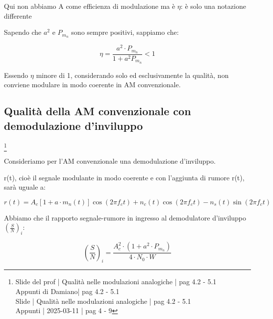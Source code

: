 \begin{tcolorbox}
    Qui non abbiamo A come efficienza di modulazione ma è $\eta$: è solo una notazione differente
\end{tcolorbox}

Sapendo che $a^{2}$ e $P_{m_n}$ sono sempre positivi, sappiamo che: 

{
    \Large 
    \begin{equation}
        \eta = \frac{a^{2} \cdot P_{m_n}}{1 + a^{2} P_{m_n}} < 1
    \end{equation}
}

Essendo $\eta$ minore di 1, considerando solo ed esclusivamente la qualità, non conviene modulare in modo coerente in AM convenzionale. \newline 

\newpage 

\subsection{Qualità della AM convenzionale con demodulazione d'inviluppo }
\footnote{Slide del prof | Qualità nelle modulazioni analogiche | pag 4.2 - 5.1\\  
Appunti di Damiano| pag 4.2 - 5.1\\
Slide | Qualità nelle modulazioni analogiche | pag 4.2 - 5.1 \\
Appunti | 2025-03-11 | pag 4 - 9  
} 

Consideriamo per l'AM convenzionale una demodulazione d'inviluppo. \newline 

r(t), cioè il segnale modulante in modo coerente e con l'aggiunta di rumore r(t), sarà uguale a: 

{
    \Large 
    \begin{equation}
        r(t)
        =
        A_c \left[ 1 + a \cdot m_n (t)\right] 
        \cos(2 \pi f_c t)
        +
        n_c (t) \cos(2 \pi f_c t) 
        - 
        n_s (t) \sin(2 \pi f_c t) 
    \end{equation}
}


Abbiamo che il rapporto segnale-rumore in ingresso al demodulatore d'inviluppo $\left( \frac{S}{N}\right)_{i}$: 

{
    \Large 
    \begin{equation}
        \left( \frac{S}{N}\right)_{i}
        =
        \frac{A_c ^{2} \cdot \left( 1 + a^{2} \cdot P_{m_n}\right)}{4 \cdot N_0 \cdot W}
    \end{equation}
}

